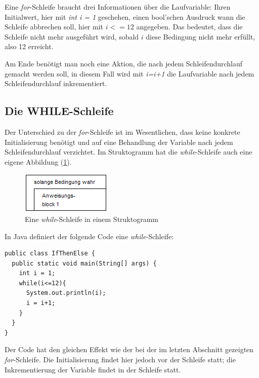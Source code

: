Eine \textit{for}-Schleife braucht drei Informationen über die Laufvariable: Ihren Initialwert, hier mit \textit{int i = 1} geschehen, einen bool'schen Ausdruck wann die Schleife abbrechen soll, hier mit $i <=12$ angegeben. Das bedeutet, dass die Schleife nicht mehr ausgeführt wird, sobald $i$ diese Bedingung nicht mehr erfüllt, also 12 erreicht.

Am Ende benötigt man noch eine Aktion, die nach jedem Schleifendurchlauf gemacht werden soll, in diesem Fall wird mit \textit{i=i+1} die Laufvariable nach jedem Schleifendurchlauf inkrementiert.

\subsection{Die WHILE-Schleife}

Der Unterschied zu der \textit{for}-Schleife ist im Wesentlichen, dass keine konkrete Initialisierung benötigt und auf eine Behandlung der Variable nach jedem Schleifendurchlauf verzichtet. Im Struktogramm hat die \textit{while}-Schleife auch eine eigene Abbildung (\ref{while}).

\begin{figure}
	\begin{center}\includegraphics[scale=1]{images/while.png}\end{center}
	\caption{Eine \textit{while}-Schleife in einem Struktogramm}
	\label{while}
\end{figure}

In Java definiert der folgende Code eine \textit{while}-Schleife:

\begin{minipage}{\textwidth}
\begin{lstlisting}
public class IfThenElse {
  public static void main(String[] args) {
    int i = 1;
    while(i<=12){
      System.out.println(i);
      i = i+1;
    }
  }
}
\end{lstlisting}
\end{minipage}

Der Code hat den gleichen Effekt wie der bei der im letzten Abschnitt gezeigten \textit{for}-Schleife. Die Initialisierung findet hier jedoch vor der Schleife statt; die Inkrementierung der Variable findet in der Schleife statt.

